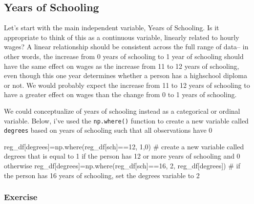 \documentclass[
  letterpaper,
  DIV=11,
  numbers=noendperiod]{scrreprt}
\newenvironment{Shaded}{\begin{snugshade}}{\end{snugshade}}
\newcommand{\CommentTok}[1]{\textcolor[rgb]{0.37,0.37,0.37}{#1}}
\newcommand{\DecValTok}[1]{\textcolor[rgb]{0.68,0.00,0.00}{#1}}
\newcommand{\NormalTok}[1]{\textcolor[rgb]{0.00,0.23,0.31}{#1}}
\newcommand{\OperatorTok}[1]{\textcolor[rgb]{0.37,0.37,0.37}{#1}}
\newcommand{\StringTok}[1]{\textcolor[rgb]{0.13,0.47,0.30}{#1}}
\begin{document}
\hypertarget{years-of-schooling}{%
\subsection{Years of Schooling}\label{years-of-schooling}}

Let's start with the main independent variable, Years of Schooling. Is
it appropriate to think of this as a continuous variable, linearly
related to hourly wages? A linear relationship should be consistent
across the full range of data-- in other words, the increase from 0
years of schooling to 1 year of schooling should have the same effect on
wages as the increase from 11 to 12 years of schooling, even though this
one year determines whether a person has a highschool diploma or not. We
would probably expect the increase from 11 to 12 years of schooling to
have a greater effect on wages than the change from 0 to 1 years of
schooling.

We could conceptualize of years of schooling instead as a categorical or
ordinal variable. Below, i've used the \texttt{np.where()} function to
create a new variable called \texttt{degrees} based on years of
schooling such that all observations have 0

\begin{Shaded}
\begin{Highlighting}[]
\NormalTok{reg\_df[}\StringTok{\textquotesingle{}degrees\textquotesingle{}}\NormalTok{]}\OperatorTok{=}\NormalTok{np.where(reg\_df[}\StringTok{\textquotesingle{}sch\textquotesingle{}}\NormalTok{]}\OperatorTok{==}\DecValTok{12}\NormalTok{, }\DecValTok{1}\NormalTok{,}\DecValTok{0}\NormalTok{) }\CommentTok{\# create a new variable called degrees that is equal to 1 if the person has 12 or more years of schooling and 0 otherwise}
\NormalTok{reg\_df[}\StringTok{\textquotesingle{}degrees\textquotesingle{}}\NormalTok{]}\OperatorTok{=}\NormalTok{np.where(reg\_df[}\StringTok{\textquotesingle{}sch\textquotesingle{}}\NormalTok{]}\OperatorTok{==}\DecValTok{16}\NormalTok{, }\DecValTok{2}\NormalTok{, reg\_df[}\StringTok{\textquotesingle{}degrees\textquotesingle{}}\NormalTok{]) }\CommentTok{\# if the person has 16 years of schooling, set the degrees variable to 2}
\end{Highlighting}
\end{Shaded}

\hypertarget{exercise-26}{%
\subsubsection{Exercise}\label{exercise-26}}
\end{document}
